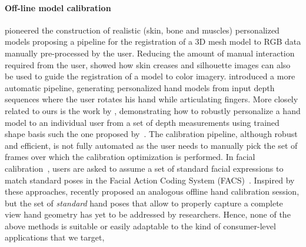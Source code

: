 \paragraph{Off-line model calibration}
\cite{albrecht2003construction} pioneered the construction of realistic (skin, bone and muscles) personalized models proposing a pipeline for the registration of a 3D mesh model to RGB data manually pre-processed by the user. Reducing the amount of manual interaction required from the user, \cite{rhee2006human} showed how skin creases and silhouette images can also be used to guide the registration of a model to color imagery. \cite{taylor2014user} introduced a more automatic pipeline, generating personalized hand models from input depth sequences where the user rotates his hand while articulating fingers. More closely related to ours is the work by \cite{tan2016fits}, demonstrating how to robustly personalize a hand model to an individual user from a set of depth measurements using trained shape basis such the one proposed by~\cite{khamis2015learning}. The calibration pipeline, although robust and efficient, is not fully automated as the user needs to manually pick the set of frames over which the calibration optimization is performed. 
In facial calibration~\cite{weise2011realtime}, users are asked to assume a set of standard facial expressions to match standard poses in the Facial Action Coding System (FACS)~\cite{facs}.
Inspired by these approaches, \cite{taylor2016joint} recently proposed an analogous offline hand calibration session, but the set of \emph{standard} hand poses that allow to properly capture a complete view hand geometry has yet to be addressed by researchers. Hence, none of the above methods is suitable or easily adaptable to the kind of consumer-level applications that we target,  

